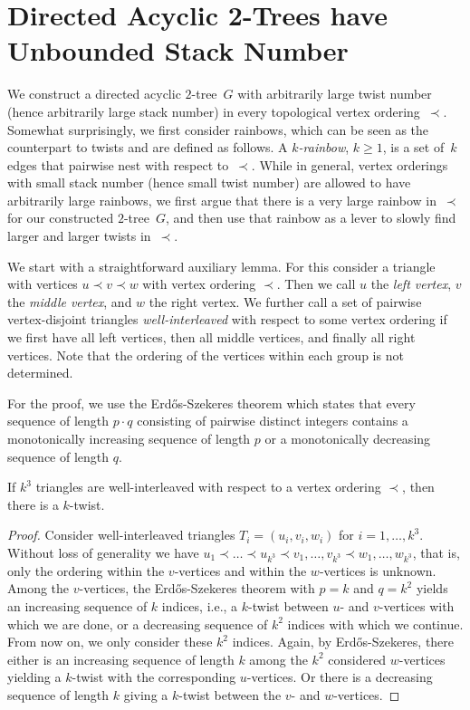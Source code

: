 \documentclass{article}
\begin{document}
\section{Directed Acyclic 2-Trees have Unbounded Stack Number}
\label{sec:2trees}

We construct a directed acyclic $2$-tree~$G$ with arbitrarily large twist number (hence arbitrarily large stack number) in every topological vertex ordering~$\prec$.
Somewhat surprisingly, we first consider rainbows, which can be seen as the counterpart to twists and are defined as follows.
A \emph{$k$-rainbow}, $k \geq 1$, is a set of~$k$ edges that pairwise nest with respect to~$\prec$.
While in general, vertex orderings with small stack number (hence small twist number) are allowed to have arbitrarily large rainbows, we first argue that there is a very large rainbow in~$\prec$ for our constructed $2$-tree~$G$, and then use that rainbow as a lever to slowly find larger and larger twists in~$\prec$.

We start with a straightforward auxiliary lemma.
For this consider a triangle with vertices $ u \prec v \prec w $ with vertex ordering $ \prec $.
Then we call $ u $ the \emph{left vertex}, $ v $ the \emph{middle vertex}, and $ w $ the right vertex.
We further call a set of pairwise vertex-disjoint triangles \emph{well-interleaved} with respect to some vertex ordering if we first have all left vertices, then all middle vertices, and finally all right vertices.
Note that the ordering of the vertices within each group is not determined.

For the proof, we use the Erd\H{o}s-Szekeres theorem which states that every sequence of length $ p \cdot q $ consisting of pairwise distinct integers contains a monotonically increasing sequence of length $ p $ or a monotonically decreasing sequence of length $ q $.

\begin{lemma}
    \label{lem:triangles}
    If $ k^3 $ triangles are well-interleaved with respect to a vertex ordering $ \prec $, then there is a $ k $-twist.
\end{lemma}

\begin{proof}
    Consider well-interleaved triangles $ T_i = (u_i, v_i, w_i) $ for $ i = 1, \dots, k^3 $.
    Without loss of generality we have $ u_1 \prec \dots \prec u_{k^3} \prec v_1, \dots, v_{k^3} \prec w_1, \dots, w_{k^3} $, that is, only the ordering within the $ v $-vertices and within the $ w $-vertices is unknown.
    Among the $ v $-vertices, the Erd\H{o}s-Szekeres theorem with $ p = k $ and $ q = k^2 $ yields an increasing sequence of $ k $ indices, i.e., a $ k $-twist between $ u $- and $ v $-vertices with which we are done, or a decreasing sequence of $ k^2 $ indices with which we continue.
    From now on, we only consider these $ k^2 $ indices.
    Again, by Erd\H{o}s-Szekeres, there either is an increasing sequence of length $ k $ among the $ k^2 $ considered $ w $-vertices yielding a $ k $-twist with the corresponding $ u $-vertices.
    Or there is a decreasing sequence of length $ k $ giving a $ k $-twist between the $ v $- and $ w $-vertices.
\end{proof}
\end{document}
